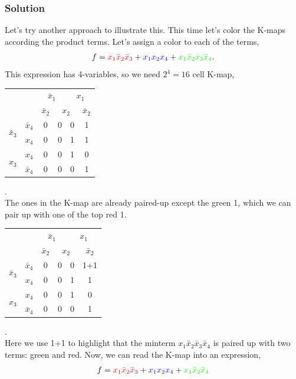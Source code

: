\documentclass[twocolumn]{article}
\newcommand{\bx}{\bar{x}}
\begin{document}
\subsubsection*{Solution}
Let's try another approach to illustrate this. This time let's color the K-maps
according the product terms. Let's assign a color to each of the terms,
%
\begin{align}
f = {\color{red}x_1\bx_2\bx_3} + {\color{blue}x_1x_2x_4} + {\color{green}x_1\bx_2 x_3\bx_4}.
  \label{eq:2-src}
\end{align}
%
This expression has 4-variables, so we need $2^{4} = 16$ cell K-map,
\\
\begin{tabular}{c|c|c|c|c|c}
  \toprule
  && \multicolumn{2}{c|}{$\bx_1$} & \multicolumn{2}{c}{$x_1$}
  \\
  && $\bx_2$ & \multicolumn{2}{c|}{$x_2$} & $\bx_2$
  \\ \midrule
  \multirow{2}{*}{$\bx_3$} & $\bx_4$
                                  & 0 & 0 & 0 & {\color{red}1}
  \\
  & $x_4$
                                  & 0 & 0 & {\color{blue}1} & {\color{red}1}
  \\
  \multirow{2}{*}{$x_3$}   &  $x_4$
                                  & 0 & 0 & {\color{blue}1} & 0
  \\
  & $\bx_4$
                                  & 0 & 0 & 0 & {\color{green}1}
  \\\bottomrule
\end{tabular}.
\\
The ones in the K-map are already paired-up except the green {\color{green}1},
which we can pair up with one of the top red {\color{red}1}.
\\
\begin{tabular}{c|c|c|c|c|c}
  \toprule
  && \multicolumn{2}{c|}{$\bx_1$} & \multicolumn{2}{c}{$x_1$}
  \\
  && $\bx_2$ & \multicolumn{2}{c|}{$x_2$} & $\bx_2$
  \\ \midrule
  \multirow{2}{*}{$\bx_3$} & $\bx_4$
                                  & 0 & 0 & 0 & {\color{green}1}+{\color{red}1}
  \\
  & $x_4$
                                  & 0 & 0 & {\color{blue}1} & {\color{red}1}
  \\
  \multirow{2}{*}{$x_3$}   &  $x_4$
                                  & 0 & 0 & {\color{blue}1} & 0
  \\
  & $\bx_4$
                                  & 0 & 0 & 0 & {\color{green}1}
  \\\bottomrule
\end{tabular}.
\\
Here we use {\color{green}1}+{\color{red}1} to highlight that the minterm
$x_1\bx_2\bx_3\bx_4$ is paired up with two terms: green and red. Now, we can read the K-map
into an expression,
\begin{align}
  f = {\color{red}x_1\bx_2\bx_3} + {\color{blue}x_1x_2x_4} + {\color{green}x_1\bx_2\bx_4}
\end{align}
\end{document}
